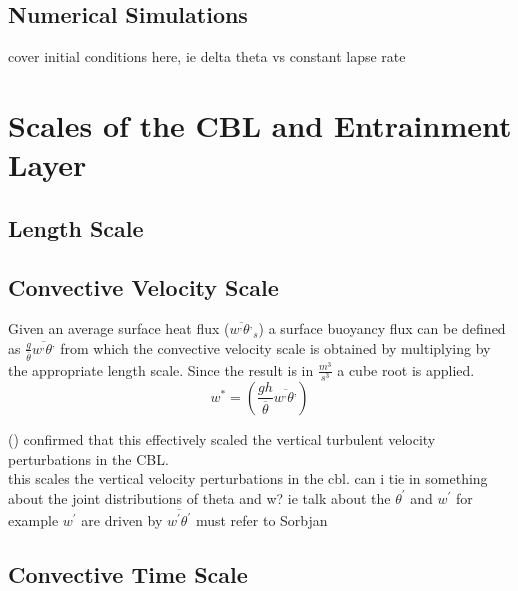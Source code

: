 \subsection{Numerical Simulations}
\label{subsec:}

cover initial conditions here, ie delta theta vs constant lapse rate

\section{Scales of the CBL and Entrainment Layer}
\label{sec:}

\subsection{Length Scale}
\label{subsec:}


\subsection{Convective Velocity Scale}
\label{subsec:}

Given an average surface heat flux ($\overline{w^{,}\theta^{,}}_{s}$) a surface buoyancy flux can be defined as 
$\frac{g}{\overline{\theta}}\overline{w^{,}\theta^{,}}$ from which the convective velocity scale is obtained by
multiplying by the appropriate length scale.  Since the result is in $\frac{m^{3}}{s^{3}}$ a cube root is applied.\\

\begin{equation}
w^{*} = \left( \frac{gh}{\overline{\theta}}\overline{w^{,}\theta^{,}} \right)
\end{equation}

\citeauthor{Deardorff70} (\cite{Deardorff70}) confirmed that this effectively scaled the vertical turbulent velocity
perturbations in the \acs{CBL}.\\

this scales the vertical velocity perturbations in the cbl. 
can i tie in something about the joint distributions of theta and w?
ie talk about the $\theta^{'}$ and $w^{'}$
for example $w^{'}$ are driven by $\overline{w^{'}\theta^{'}}$
must refer to Sorbjan

\subsection{Convective Time Scale}
\label{}

